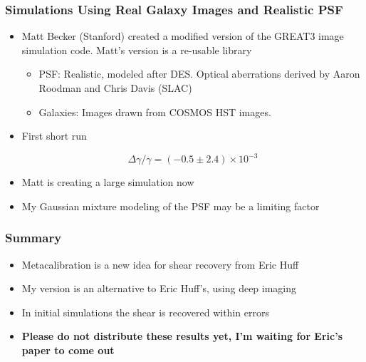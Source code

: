 \documentclass{beamer}
\begin{document}
\frame
{
    \frametitle{Simulations Using Real Galaxy Images and Realistic PSF}

 
    \begin{itemize}

        \item Matt Becker (Stanford) created a modified version of 
            the GREAT3 image simulation code. Matt's version is
            a re-usable library

        \begin{itemize}
            \item {\color{cyan} PSF}: Realistic, modeled after DES.  Optical aberrations derived
                by Aaron Roodman and Chris Davis (SLAC)

            \item {\color{cyan} Galaxies}: Images drawn from COSMOS HST images.
        \end{itemize}

        \item First short run

            {\color{gold}
                \begin{equation}
                    \Delta \gamma/\gamma = (-0.5 \pm 2.4) \times 10^{-3} \nonumber
                \end{equation}
            }
        \item Matt is creating a large simulation now

        \item My Gaussian mixture modeling of the PSF may be a limiting
            factor

    \end{itemize}

}

\frame
{
    \frametitle{Summary}

 
    \begin{itemize}
        \item Metacalibration is a new idea for shear recovery from
            Eric Huff

        \item My version is an alternative to Eric Huff's, using
            deep imaging
        
        \item In initial simulations the shear is recovered within errors

        \item {\color{brightred}
                \textbf{
                    Please do not distribute these results yet, I'm waiting for Eric's paper to come out
                }
        }

    \end{itemize}

}
\end{document}
